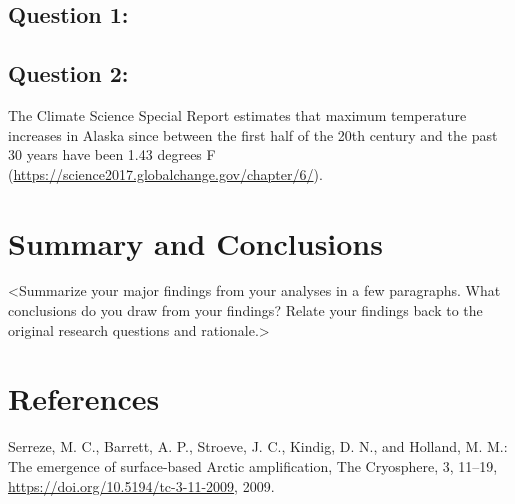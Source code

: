 \documentclass[12pt,]{article}
\begin{document}
\hypertarget{question-1}{%
\subsection{Question 1: }\label{question-1}}

\hypertarget{question-2}{%
\subsection{Question 2:}\label{question-2}}

The Climate Science Special Report estimates that maximum temperature
increases in Alaska since between the first half of the 20th century and
the past 30 years have been 1.43 degrees F
(\url{https://science2017.globalchange.gov/chapter/6/}).

\newpage

\hypertarget{summary-and-conclusions}{%
\section{Summary and Conclusions}\label{summary-and-conclusions}}

\textless{}Summarize your major findings from your analyses in a few
paragraphs. What conclusions do you draw from your findings? Relate your
findings back to the original research questions and
rationale.\textgreater{}

\newpage

\hypertarget{references}{%
\section{References}\label{references}}

 Serreze, M. C., Barrett, A. P., Stroeve, J. C., Kindig, D. N., and
Holland, M. M.: The emergence of surface-based Arctic amplification, The
Cryosphere, 3, 11--19, \url{https://doi.org/10.5194/tc-3-11-2009}, 2009.
\end{document}
